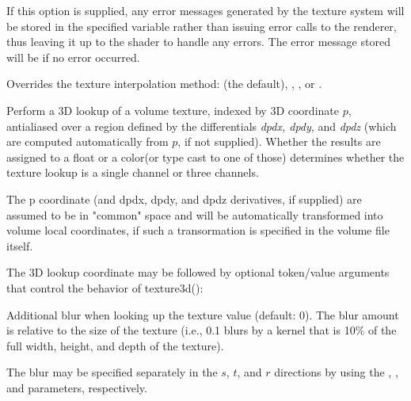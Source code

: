 \documentclass[11pt,letterpaper]{book}
\def\color{{\cf color}\xspace}
\def\float{{\cf float}\xspace}
\def\commonspace{{\cf "common"} space\xspace}
\begin{document}
\vspace{12pt}
\NEW  %
If this option is supplied, any error messages generated by the texture
system will be stored in the specified variable rather than issuing error
calls to the renderer, thus leaving it up to the shader to handle any
errors. The error message stored will be \qkw{} if no error occurred.
\apiend
\vspace{-16pt}

\vspace{12pt}
Overrides the texture interpolation method:  (the 
default), , , or .
\apiend
\vspace{-16pt}

\apiend


Perform a 3D lookup of a volume texture, indexed by 3D coordinate
$p$, antialiased over a region defined by the differentials
\emph{dpdx, dpdy}, and \emph{dpdz} (which are computed
automatically from $p$, if not supplied).  Whether the results
are assigned to a \float or a \color (or type cast to one of those)
determines whether the texture lookup is a single channel or three
channels.

The {\cf p} coordinate (and {\cf dpdx}, {\cf dpdy}, and {\cf dpdz}
derivatives, if supplied) are assumed to be in \commonspace and will be
automatically transformed into volume local coordinates, if such a
transormation is specified in the volume file itself.

The 3D lookup coordinate may be followed by optional token/value
arguments that control the behavior of {\cf texture3d()}:

\vspace{12pt}
Additional blur when looking up the texture value (default: 0).  The
blur amount is relative to the size of the texture (i.e., 0.1 blurs by a
kernel that is 10\% of the full width, height, and depth of the texture).

The blur may be specified separately in the $s$, $t$, and $r$ directions by
using the , , and  parameters, respectively.
\apiend
\vspace{-16pt}
\end{document}

